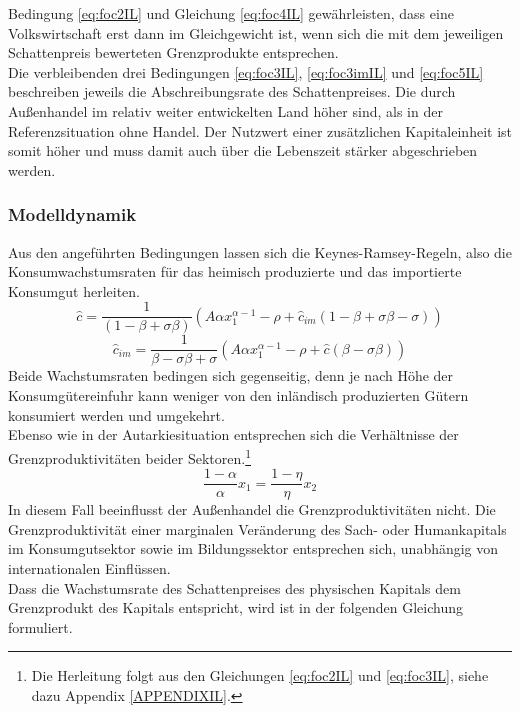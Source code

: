 Bedingung \eqref{eq:foc2IL} und Gleichung \eqref{eq:foc4IL} gewährleisten, dass eine Volkswirtschaft erst dann im Gleichgewicht ist, wenn sich die mit dem jeweiligen Schattenpreis bewerteten Grenzprodukte entsprechen.\\
Die verbleibenden drei Bedingungen \eqref{eq:foc3IL}, \eqref{eq:foc3imIL} und \eqref{eq:foc5IL} beschreiben jeweils die Abschreibungsrate des Schattenpreises. Die durch Au{\ss}enhandel im relativ weiter entwickelten Land höher sind, als in der Referenzsituation ohne Handel. Der Nutzwert einer zusätzlichen Kapitaleinheit ist somit höher und muss damit auch über die Lebenszeit stärker abgeschrieben werden. 

\subsubsection*{Modelldynamik}
Aus den angeführten Bedingungen lassen sich die Keynes-Ramsey-Regeln, also die Konsumwachstumsraten für das heimisch produzierte und das importierte Konsumgut herleiten. 
\begin{equation}
\boxed{
\hat{c}=\frac{1}{(1-\beta+\sigma\beta)}\left(A\alpha x_1^{\alpha -1}-\rho+\hat{c}_{im}(1-\beta+\sigma\beta-\sigma)\right)}
\end{equation}
\begin{equation}
\boxed{
\hat{c}_{im}=\frac{1}{\beta-\sigma\beta+ \sigma}\left(A\alpha x_1^{\alpha -1}-\rho+\hat{c}(\beta - \sigma\beta)\right)}
\end{equation}
Beide Wachstumsraten bedingen sich gegenseitig, denn je nach Höhe der Konsum\-güter\-einfuhr kann weniger von den inländisch produzierten Gütern konsumiert werden und umgekehrt.\\
Ebenso wie in der Autarkiesituation entsprechen sich die Verhältnisse der Grenzproduktivitäten beider Sektoren.\footnote{Die Herleitung folgt aus den Gleichungen \eqref{eq:foc2IL} und \eqref{eq:foc3IL}, siehe dazu Appendix \ref{APPENDIXIL}.}
\begin{equation}
\boxed{\frac{1-\alpha}{\alpha}x_1=\frac{1-\eta}{\eta}x_2}
\end{equation}
In diesem Fall beeinflusst der Au{\ss}enhandel die Grenzproduktivitäten nicht. Die Grenzproduktivität einer marginalen Veränderung des Sach- oder Humankapitals im Konsumgutsektor sowie im Bildungssektor entsprechen sich, unabhängig von internationalen Einflüssen.\\
Dass die Wachstumsrate des Schattenpreises des physischen Kapitals dem Grenzprodukt des Kapitals entspricht, wird ist in der folgenden Gleichung formuliert. 
